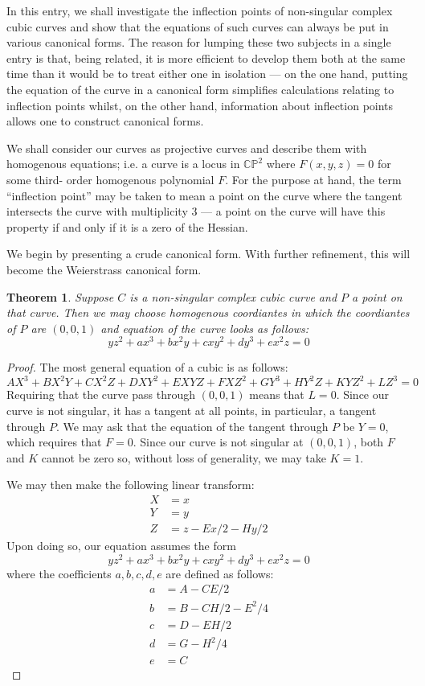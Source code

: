 \documentclass[12pt]{article}
\newtheorem{thm}{Theorem}
\begin{document}
In this entry, we shall investigate the inflection points 
of non-singular complex cubic curves and show that the
equations of such curves can always be put in various
canonical forms.  The reason for lumping these two subjects 
in a single entry is that, being related, it is more
efficient to develop them both at the same time than it would
be to treat either one in isolation --- on the one hand, 
putting the equation of the curve in a canonical form 
simplifies calculations relating to inflection points whilst,
on the other hand, information about inflection points allows
one to construct canonical forms.

We shall consider our curves as projective curves and describe 
them with homogenous equations; i.e. a curve is a locus in
$\mathbb{C}\mathbb{P}^2$ where $F(x,y,z) = 0$ for some third-
order homogenous polynomial $F$.  For the purpose at hand, the
term ``inflection point'' may be taken to mean a point on the
curve where the tangent intersects the curve with multiplicity
3 --- a point on the curve will have this property if and only 
if it is a zero of the Hessian.

We begin by presenting a crude canonical form.  With further
refinement, this will become the Weierstrass canonical form.

\begin{thm}
Suppose $C$ is a non-singular complex cubic curve and $P$ a point
on that curve.  Then we may choose homogenous coordiantes in which 
the coordiantes of $P$ are $(0,0,1)$ and equation of the curve 
looks as follows:
\[
 y z^2 + a x^3 + b x^2 y + c x y^2 + d y^3 + e x^2 z = 0
\] 
\end{thm}

\begin{proof}
The most general equation of a cubic is as follows:
\[
 A X^3 + B X^2 Y + C X^2 Z + D X Y^2 + E XYZ + F X Z^2 +
 G Y^3 + H Y^2 Z + K Y Z^2 + L Z^3 = 0
\]
Requiring that the curve pass through $(0,0,1)$ means that
$L = 0$.  Since our curve is not singular, it has a tangent
at all points, in particular, a tangent through $P$.  We
may ask that the equation of the tangent through $P$ be
$Y=0$, which requires that $F = 0$.  Since our curve is
not singular at $(0,0,1)$, both $F$ and $K$ cannot be zero
so, without loss of generality, we may take $K = 1$.

We may then make the following linear transform:
\begin{align*}
X &= x \\
Y &= y \\
Z &= z - Ex/2 - Hy/2 
\end{align*}
Upon doing so, our equation assumes the form
\[
 y z^2 + a x^3 + b x^2 y + c x y^2 + d y^3 + e x^2 z = 0
\]
where the coefficients $a,b,c,d,e$ are defined as follows:
\begin{align*}
a &= A - CE/2 \\
b &= B - CH/2 - E^2/4 \\
c &= D - EH/2 \\
d &= G - H^2/4 \\
e &= C
\end{align*}
\end{proof}
\end{document}
